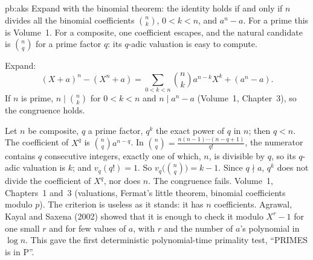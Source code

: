 \begin{solution}{pb:aks}
\idea Expand with the binomial theorem: the identity holds if and only if $n$ divides all the binomial coefficients $\binom nk$,
$0<k<n$, and $a^n-a$. For a prime this is Volume~1. For a composite, one coefficient escapes, and the natural candidate is
$\binom nq$ for a prime factor $q$: its $q$-adic valuation is easy to compute.

\writeup Expand:
\[
(X+a)^n-(X^n+a)=\sum_{0<k<n}\binom nka^{n-k}X^k+(a^n-a).
\]
If $n$ is prime, $n\mid\binom nk$ for $0<k<n$ and $n\mid a^n-a$
(Volume~1, Chapter~3), so the congruence holds.

Let $n$ be composite, $q$ a prime factor, $q^k$ the exact power of $q$ in $n$; then $q<n$. The coefficient of $X^q$ is
$\binom nqa^{n-q}$. In $\binom nq=\frac{n(n-1)\cdots(n-q+1)}{q!}$, the numerator contains $q$ consecutive integers, exactly one of which,
$n$, is divisible by $q$, so its $q$-adic valuation is $k$; and $v_q(q!)=1$. So $v_q\bigl(\binom nq\bigr)=k-1$. Since $q\nmid a$, $q^k$
does not divide the coefficient of $X^q$, nor does $n$. The congruence fails.
\tools Volume~1, Chapters~1 and~3 (valuations, Fermat's little theorem, binomial coefficients modulo $p$).
\leads The criterion is useless as it stands: it has $n$ coefficients. Agrawal, Kayal and Saxena (2002) showed that it is
enough to check it modulo $X^r-1$ for one small $r$ and for few values of $a$, with $r$ and the number of $a$'s polynomial in
$\log n$. This gave the first deterministic polynomial-time primality test, ``PRIMES is in P''.
\end{solution}

